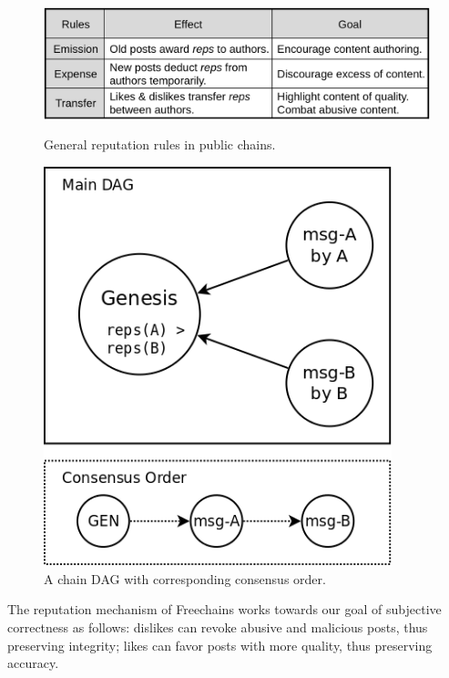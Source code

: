 \documentclass[12pt]{article}
\begin{document}
\begin{figure}
    \centering
    \begin{minipage}{0.60\textwidth}
        \centering
        \includegraphics[width=\textwidth]{general.png}
        \caption{General reputation rules in public chains.}
        \label{fig.general}
    \end{minipage}\hfill
    \begin{minipage}{0.40\textwidth}
        \centering
        \includegraphics[width=0.9\textwidth]{dag.png}
        \caption{A chain DAG with corresponding consensus order.}
        \label{fig.dag}
    \end{minipage}
\end{figure}

The reputation mechanism of Freechains works towards our goal of subjective
correctness as follows:
    dislikes can revoke abusive and malicious posts, thus preserving integrity;
    likes can favor posts with more quality, thus preserving accuracy.
\end{document}
